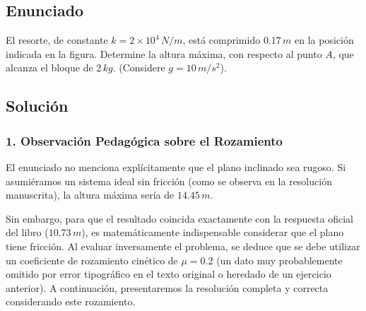 \documentclass[12pt, a4paper]{article}
\begin{document}
\newpage

\subsection*{Enunciado}
El resorte, de constante $k = 2 \times 10^4 \, \si{N/m}$, está comprimido $0.17 \, \si{m}$ en la posición indicada en la figura. Determine la altura máxima, con respecto al punto $A$, que alcanza el bloque de $2 \, \si{kg}$. (Considere $g = 10 \, \si{m/s^2}$).

\begin{center}
\end{center}

\subsection*{Solución}

\subsubsection*{1. Observación Pedagógica sobre el Rozamiento}
El enunciado no menciona explícitamente que el plano inclinado sea rugoso. Si asumiéramos un sistema ideal sin fricción (como se observa en la resolución manuscrita), la altura máxima sería de $14.45 \, \si{m}$. 

Sin embargo, para que el resultado coincida exactamente con la respuesta oficial del libro ($10.73 \, \si{m}$), es matemáticamente indispensable considerar que el plano tiene fricción. Al evaluar inversamente el problema, se deduce que se debe utilizar un coeficiente de rozamiento cinético de $\mu = 0.2$ (un dato muy probablemente omitido por error tipográfico en el texto original o heredado de un ejercicio anterior). A continuación, presentaremos la resolución completa y correcta considerando este rozamiento.
\end{document}
